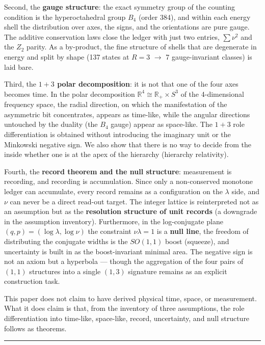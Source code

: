 \documentclass[
]{article}
\begin{document}
Second, the \textbf{gauge structure}: the exact symmetry group of the
counting condition is the hyperoctahedral group \(B_4\) (order 384), and
within each energy shell the distribution over axes, the signs, and the
orientations are pure gauge. The additive conservation laws close the
ledger with just two entries, \(\sum\nu^2\) and the \(Z_2\) parity. As a
by-product, the fine structure of shells that are degenerate in energy
and split by shape (137 states at \(R=3\) \(\to\) 7 gauge-invariant
classes) is laid bare.

Third, the \textbf{\(1{+}3\) polar decomposition}: it is not that one of
the four axes becomes time. In the polar decomposition
\(\mathbb{R}^4\cong\mathbb{R}_+\times S^3\) of the 4-dimensional
frequency space, the radial direction, on which the manifestation of the
asymmetric bit concentrates, appears as time-like, while the angular
directions untouched by the duality (the \(B_4\) gauge) appear as
space-like. The \(1{+}3\) role differentiation is obtained without
introducing the imaginary unit or the Minkowski negative sign. We also
show that there is no way to decide from the inside whether one is at
the apex of the hierarchy (hierarchy relativity).

Fourth, the \textbf{record theorem and the null structure}: measurement
is recording, and recording is accumulation. Since only a non-conserved
monotone ledger can accumulate, every record remains as a configuration
on the \(\lambda\) side, and \(\nu\) can never be a direct read-out
target. The integer lattice is reinterpreted not as an assumption but as
the \textbf{resolution structure of unit records} (a downgrade in the
assumption inventory). Furthermore, in the log-conjugate plane
\((q,p)=(\log\lambda,\log\nu)\) the constraint \(\nu\lambda=1\) is a
\textbf{null line}, the freedom of distributing the conjugate widths is
the \(SO(1,1)\) boost (squeeze), and uncertainty is built in as the
boost-invariant minimal area. The negative sign is not an axiom but a
hyperbola --- though the aggregation of the four pairs of \((1,1)\)
structures into a single \((1,3)\) signature remains as an explicit
construction task.

This paper does not claim to have derived physical time, space, or
measurement. What it does claim is that, from the inventory of three
assumptions, the role differentiation into time-like, space-like,
record, uncertainty, and null structure follows as theorems.

\begin{center}\rule{0.5\linewidth}{0.5pt}\end{center}
\end{document}
